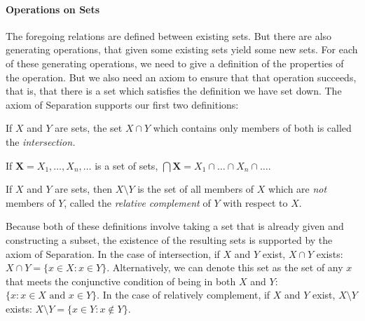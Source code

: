 \paragraph{Operations on Sets} The foregoing relations are defined between existing sets. But there are also generating operations, that given some existing sets yield some new sets. For each of these generating operations, we need to give a definition of the properties of the operation. But we also need an axiom to ensure that that operation succeeds, that is, that there is a set which satisfies the definition we have set down. The axiom of Separation supports our first two definitions: 
\begin{definition}[Intersection] If $X$ and $Y$ are sets, the set $X
    \cap Y$ which contains only members of both is called the {\em
    intersection.} 

If $\mathbf{X}=X_{1},\ldots,X_{n},\ldots$ is a set of sets, $\bigcap \mathbf{X} = X_{1} \cap \ldots \cap X_{n} \cap \ldots$.
\end{definition}
 \begin{definition} If $X$ and $Y$
	are sets, then $X \setminus Y$ is the set of all members of $X$ which
	are \emph{not} members of $Y$, called the \emph{relative complement} of
	$Y$ with respect to $X$. \end{definition}
Because both of these definitions involve taking a set that is already given and constructing a subset, the existence of the resulting sets is supported by the axiom of Separation. In the case of intersection, if $X$ and $Y$ exist, $X \cap Y$ exists: $X\cap Y = \{x \in X:x\in Y\}$. Alternatively, we can denote this set as the set of any $x$ that meets the conjunctive condition of being in both $X$ and $Y$: $\{x: x\in X \text{ and } x \in Y\}$. In the case of relatively complement, if $X$ and $Y$ exist, $X\setminus Y$ exists: $X \setminus Y = \{x \in Y: x\notin Y\}$.

